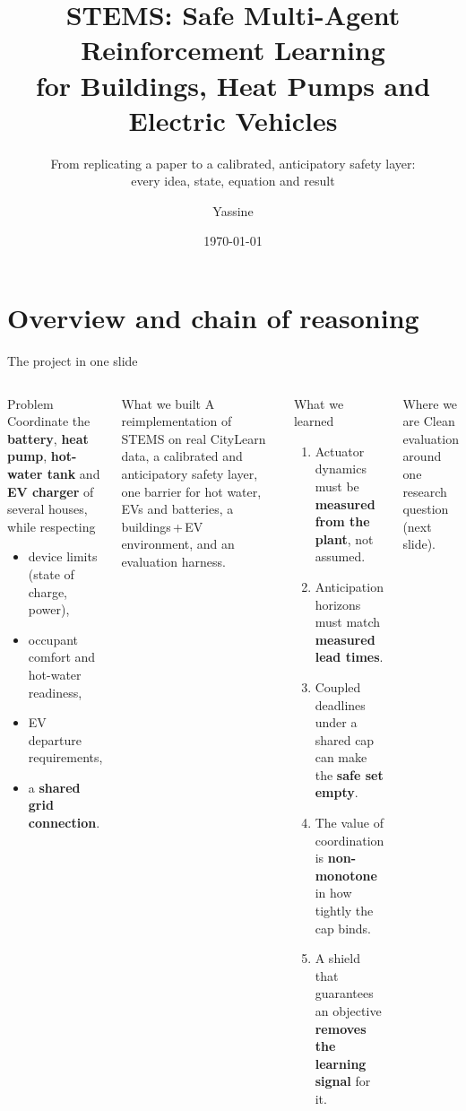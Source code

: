 \documentclass[aspectratio=169,10pt]{beamer}
\title{STEMS: Safe Multi-Agent Reinforcement Learning\\for Buildings, Heat Pumps and Electric Vehicles}
\subtitle{From replicating a paper to a calibrated, anticipatory safety layer:\\every idea, state, equation and result}
\author{Yassine}   %
\date{\today}
\begin{document}
\begin{frame}
  \titlepage
\end{frame}

\section{Overview and chain of reasoning}

\begin{frame}{The project in one slide}
\small
\begin{columns}[T]
\begin{block}{Problem}
Coordinate the \textbf{battery}, \textbf{heat pump}, \textbf{hot-water tank} and \textbf{EV charger} of several houses, while respecting
\begin{itemize}
  \item device limits (state of charge, power),
  \item occupant comfort and hot-water readiness,
  \item EV departure requirements,
  \item a \textbf{shared grid connection}.
\end{itemize}
\end{block}
\begin{block}{What we built}
A reimplementation of STEMS on real CityLearn data, a calibrated and anticipatory safety layer, one barrier for hot water, EVs and batteries, a buildings\,+\,EV environment, and an evaluation harness.
\end{block}
\begin{exampleblock}{What we learned}
\begin{enumerate}
  \item Actuator dynamics must be \textbf{measured from the plant}, not assumed.
  \item Anticipation horizons must match \textbf{measured lead times}.
  \item Coupled deadlines under a shared cap can make the \textbf{safe set empty}.
  \item The value of coordination is \textbf{non-monotone} in how tightly the cap binds.
  \item A shield that guarantees an objective \textbf{removes the learning signal} for it.
\end{enumerate}
\end{exampleblock}
\begin{alertblock}{Where we are}
Clean evaluation around one research question (next slide).
\end{alertblock}
\end{columns}
\end{frame}
\end{document}
